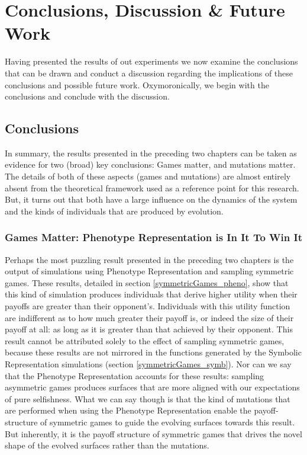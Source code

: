 \documentclass[11pt]{book}
\begin{document}
\chapter{Conclusions, Discussion \& Future Work}\label{conclusions_and_discussion}

Having presented the results of out experiments we now examine the conclusions that can be drawn and conduct a discussion regarding the implications of these conclusions and possible future work.
Oxymoronically, we begin with the conclusions and conclude with the discussion.

\section{Conclusions}\label{conclusions}

In summary, the results presented in the preceding two chapters can be taken as evidence for two (broad) key conclusions: Games matter, and mutations matter.
The details of both of these aspects (games and mutations) are almost entirely absent from the theoretical framework used as a reference point for this research.
But, it turns out that both have a large influence on the dynamics of the system and the kinds of individuals that are produced by evolution.


\subsection[Games Matter]{Games Matter: Phenotype Representation is In It To Win It}\label{win_it}
Perhaps the most puzzling result presented in the preceding two chapters is the output of simulations using Phenotype Representation and sampling symmetric games.
These results, detailed in section \ref{symmetricGames_pheno}, show that this kind of simulation produces individuals
that derive higher utility when their payoffs are greater than their opponent's.
Individuals with this utility function are indifferent as to how much greater their payoff is, or indeed the size of their payoff at all: as long as it is greater than that achieved by their opponent.
This result cannot be attributed solely to the effect of sampling symmetric games, because these results are not mirrored in the functions generated by the Symbolic Representation simulations (section \ref{symmetricGames_symb}).
Nor can we say that the Phenotype Representation accounts for these results: sampling asymmetric games produces surfaces that are more aligned with our expectations of pure selfishness.
What we can say though is that the kind of mutations that are performed when using the Phenotype Representation enable the payoff-structure of symmetric games to guide the evolving surfaces towards this result.
But inherently, it is the payoff structure of symmetric games that drives the novel shape of the evolved surfaces rather than the mutations.
\end{document}
